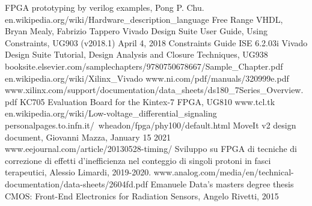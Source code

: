 \begin{thebibliography}{00}
	FPGA prototyping by verilog examples, Pong P. Chu.
	en.wikipedia.org/wiki/Hardware\_description\_language
	Free Range VHDL, Bryan Mealy, Fabrizio Tappero
	Vivado Design Suite User Guide, Using Constraints, UG903 (v2018.1) April 4, 2018
	Constraints Guide ISE 6.2.03i
	Vivado Design Suite Tutorial, Design Analysis and Closure Techniques, UG938
	booksite.elsevier.com/samplechapters/9780750678667/Sample\_Chapter.pdf
	en.wikipedia.org/wiki/Xilinx\_Vivado
	www.ni.com/pdf/manuals/320999e.pdf
	www.xilinx.com/support/documentation/data\_sheets/ds180\_7Series\_Overview.pdf
	KC705 Evaluation Board for the Kintex-7 FPGA, UG810	
	www.tcl.tk
	en.wikipedia.org/wiki/Low-voltage\_differential\_signaling
	personalpages.to.infn.it/~wheadon/fpga/phy100/default.html
	MoveIt v2 design document, Giovanni Mazza, January 15 2021
	www.eejournal.com/article/20130528-timing/
	Sviluppo su FPGA di tecniche di correzione di effetti d'inefficienza nel conteggio di singoli protoni in fasci terapeutici, Alessio Limardi, 2019-2020.
	www.analog.com/media/en/technical-documentation/data-sheets/2604fd.pdf
	Emanuele Data's masters degree thesis
	 CMOS: Front-End Electronics for Radiation Sensors, Angelo Rivetti, 2015
	
	
\end{thebibliography}
